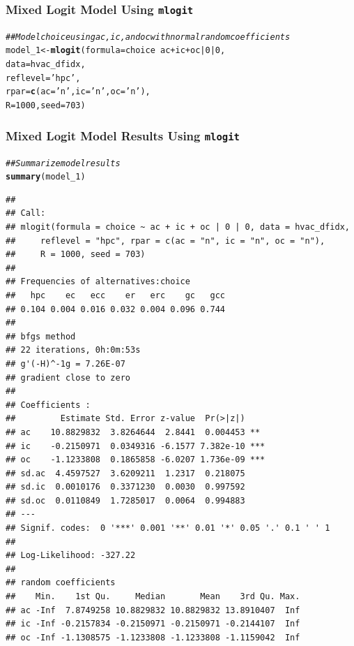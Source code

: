 \documentclass{beamer}\usepackage[]{graphicx}\usepackage[]{color}
\makeatletter
\newcommand{\hlnum}[1]{\textcolor[rgb]{0.686,0.059,0.569}{#1}}%
\newcommand{\hlstr}[1]{\textcolor[rgb]{0.192,0.494,0.8}{#1}}%
\newcommand{\hlcom}[1]{\textcolor[rgb]{0.678,0.584,0.686}{\textit{#1}}}%
\newcommand{\hlopt}[1]{\textcolor[rgb]{0,0,0}{#1}}%
\newcommand{\hlstd}[1]{\textcolor[rgb]{0.345,0.345,0.345}{#1}}%
\newcommand{\hlkwb}[1]{\textcolor[rgb]{0.69,0.353,0.396}{#1}}%
\newcommand{\hlkwc}[1]{\textcolor[rgb]{0.333,0.667,0.333}{#1}}%
\newcommand{\hlkwd}[1]{\textcolor[rgb]{0.737,0.353,0.396}{\textbf{#1}}}%
\newenvironment{kframe}{%
 \def\at@end@of@kframe{}%
 \ifinner\ifhmode%
  \def\at@end@of@kframe{\end{minipage}}%
  \begin{minipage}{\columnwidth}%
 \fi\fi%
 \def\FrameCommand##1{\hskip\@totalleftmargin \hskip-\fboxsep
 \colorbox{shadecolor}{##1}\hskip-\fboxsep
     \hskip-\linewidth \hskip-\@totalleftmargin \hskip\columnwidth}%
 \MakeFramed {\advance\hsize-\width
   \@totalleftmargin\z@ \linewidth\hsize
   \@setminipage}}%
 {\par\unskip\endMakeFramed%
 \at@end@of@kframe}
\newenvironment{knitrout}{}{} %
\makeatother
\begin{document}
\begin{frame}[fragile]\frametitle{Mixed Logit Model Using \texttt{mlogit}}
\begin{knitrout}\footnotesize
{}\color{fgcolor}\begin{kframe}
\begin{alltt}
\hlcom{## Model choice using ac, ic, and oc with normal random coefficients}
\hlstd{model_1} \hlkwb{<-} \hlkwd{mlogit}\hlstd{(}\hlkwc{formula} \hlstd{= choice} \hlopt{~} \hlstd{ac} \hlopt{+} \hlstd{ic} \hlopt{+} \hlstd{oc} \hlopt{|} \hlnum{0} \hlopt{|} \hlnum{0}\hlstd{,}
                  \hlkwc{data} \hlstd{= hvac_dfidx,}
                  \hlkwc{reflevel} \hlstd{=} \hlstr{'hpc'}\hlstd{,}
                  \hlkwc{rpar} \hlstd{=} \hlkwd{c}\hlstd{(}\hlkwc{ac} \hlstd{=} \hlstr{'n'}\hlstd{,} \hlkwc{ic} \hlstd{=} \hlstr{'n'}\hlstd{,} \hlkwc{oc} \hlstd{=} \hlstr{'n'}\hlstd{),}
                  \hlkwc{R} \hlstd{=} \hlnum{1000}\hlstd{,} \hlkwc{seed} \hlstd{=} \hlnum{703}\hlstd{)}
\end{alltt}
\end{kframe}
\end{knitrout}
\end{frame}

\begin{frame}[fragile]\frametitle{Mixed Logit Model Results Using \texttt{mlogit}}
    \vspace{1ex}
\begin{knitrout}\tiny
{}\color{fgcolor}\begin{kframe}
\begin{alltt}
\hlcom{## Summarize model results}
\hlkwd{summary}\hlstd{(model_1)}
\end{alltt}
\begin{verbatim}
## 
## Call:
## mlogit(formula = choice ~ ac + ic + oc | 0 | 0, data = hvac_dfidx, 
##     reflevel = "hpc", rpar = c(ac = "n", ic = "n", oc = "n"), 
##     R = 1000, seed = 703)
## 
## Frequencies of alternatives:choice
##   hpc    ec   ecc    er   erc    gc   gcc 
## 0.104 0.004 0.016 0.032 0.004 0.096 0.744 
## 
## bfgs method
## 22 iterations, 0h:0m:53s 
## g'(-H)^-1g = 7.26E-07 
## gradient close to zero 
## 
## Coefficients :
##         Estimate Std. Error z-value  Pr(>|z|)    
## ac    10.8829832  3.8264644  2.8441  0.004453 ** 
## ic    -0.2150971  0.0349316 -6.1577 7.382e-10 ***
## oc    -1.1233808  0.1865858 -6.0207 1.736e-09 ***
## sd.ac  4.4597527  3.6209211  1.2317  0.218075    
## sd.ic  0.0010176  0.3371230  0.0030  0.997592    
## sd.oc  0.0110849  1.7285017  0.0064  0.994883    
## ---
## Signif. codes:  0 '***' 0.001 '**' 0.01 '*' 0.05 '.' 0.1 ' ' 1
## 
## Log-Likelihood: -327.22
## 
## random coefficients
##    Min.    1st Qu.     Median       Mean    3rd Qu. Max.
## ac -Inf  7.8749258 10.8829832 10.8829832 13.8910407  Inf
## ic -Inf -0.2157834 -0.2150971 -0.2150971 -0.2144107  Inf
## oc -Inf -1.1308575 -1.1233808 -1.1233808 -1.1159042  Inf
\end{verbatim}
\end{kframe}
\end{knitrout}
\end{frame}
\end{document}
